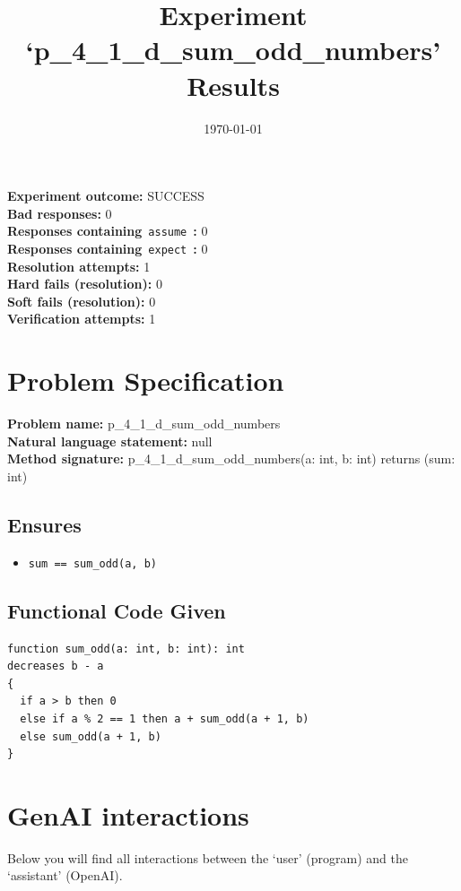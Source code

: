 \documentclass{article}
\begin{document}
\title{Experiment `p\_4\_1\_d\_sum\_odd\_numbers' Results}
\author{\today}
\date{}
\maketitle
\textbf{Experiment outcome: }SUCCESS
\\\textbf{Bad responses: }0
\\\textbf{Responses containing}~\texttt{assume}~\textbf{: }0
\\\textbf{Responses containing}~\texttt{expect}~\textbf{: }0
\\\textbf{Resolution attempts: }1
\\\textbf{Hard fails (resolution): }0
\\\textbf{Soft fails (resolution): }0
\\\textbf{Verification attempts: }1
\section*{Problem Specification}
\textbf{Problem name: }p\_4\_1\_d\_sum\_odd\_numbers
\\\textbf{Natural language statement: }null
\\\textbf{Method signature: }p\_4\_1\_d\_sum\_odd\_numbers(a: int, b: int) returns (sum: int)
\subsection*{Ensures}
\begin{itemize}
\item \texttt{sum == sum\_odd(a, b)}
\end{itemize}
\subsection*{Functional Code Given}
\begin{lstlisting}
function sum_odd(a: int, b: int): int
decreases b - a
{
  if a > b then 0
  else if a % 2 == 1 then a + sum_odd(a + 1, b)
  else sum_odd(a + 1, b)
}
\end{lstlisting}
\clearpage
\section*{GenAI interactions}
Below you will find all interactions between the `user' (program) and the `assistant' (OpenAI).
\end{document}
